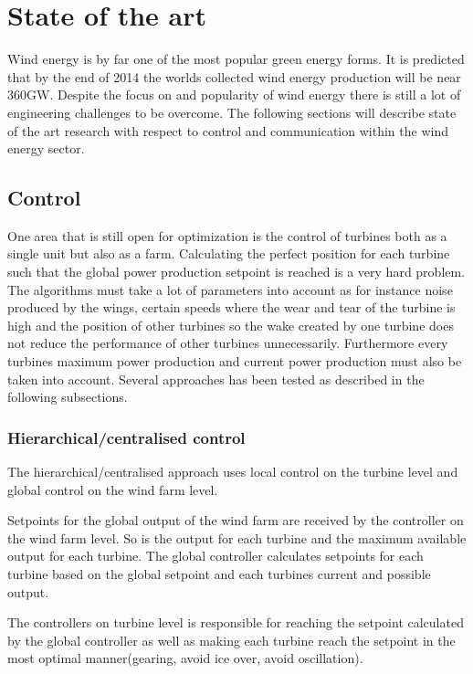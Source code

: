 \chapter{State of the art}
Wind energy is by far one of the most popular green energy forms.
It is predicted that by the end of 2014 the worlds collected wind energy production will be near 360GW\cite{worldwidewindcapacity}.
Despite the focus on and popularity of wind energy there is still a lot of engineering challenges to be overcome.
The following sections will describe state of the art research with respect to control and communication within the wind energy sector.

\section{Control}
One area that is still open for optimization is the control of turbines both as a single unit but also as a farm. 
Calculating the perfect position for each turbine such that the global power production setpoint is reached is a very hard problem.
The algorithms must take a lot of parameters into account as for instance noise produced by the wings, certain speeds where the wear and tear of the turbine is high and the position of other turbines so the wake created by one turbine does not reduce the performance of other turbines unnecessarily.
Furthermore every turbines maximum power production and current power production must also be taken into account.
Several approaches has been tested as described in the following subsections. %

\subsection{Hierarchical/centralised control}
The hierarchical/centralised approach uses local control on the turbine level and global control on the wind farm level\cite{CentralisedPowerControlOfWindFarm, HeirarchicalWindFarmControl}.

Setpoints for the global output of the wind farm are received by the controller on the wind farm level.
So is the output for each turbine and the maximum available output for each turbine.
The global controller calculates setpoints for each turbine based on the global setpoint and each turbines current and possible output.

The controllers on turbine level is responsible for reaching the setpoint calculated by the global controller as well as making each turbine reach the setpoint in the most optimal manner(gearing, avoid ice over, avoid oscillation).

